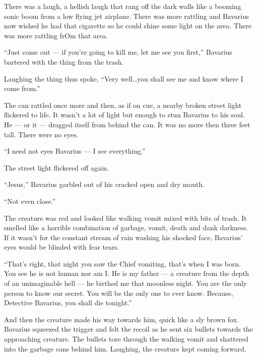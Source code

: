 There was a laugh, a hellish laugh that rang off the dark walls
like a booming sonic boom from a low flying jet airplane. There was
more rattling and Bavarius now wished he had that cigarette so he
could shine some light on the area. There was more rattling frOm
that area.



``Just come out --- if you're going to kill me, let me see
you first,'' Bavarius bartered with the thing from the
trash.



Laughing the thing thus spoke, ``Very well{\ldots}you shall see me
and know where I come from.''



The can rattled once more and then, as if on cue, a nearby broken
street light flickered to life. It wasn't a lot of light but enough
to stun Bavarius to his soul. He --- or it --- dragged
itself from behind the can. It was no more then three feet tall.
There were no eyes.



``I need not eyes Bavarius --- I see
everything.''



The street light flickered off again.



``Jesus,'' Bavarius garbled out of his cracked open and
dry mouth.



``Not even close.''



The creature was red and looked like walking vomit mixed with bits
of trash. It smelled like a horrible combination of garbage, vomit,
death and dank darkness. If it wasn't for the constant stream of
rain washing his shocked face, Bavarius' eyes would be blinded with
fear tears.



``That's right, that night you saw the Chief vomiting, that's
when I was born. You see he is not human nor am I. He is my father
--- a creature from the depth of an unimaginable hell ---
he birthed me that moonless night. You are the only person to know
our secret. You will be the only one to ever know. Because,
Detective Bavarius, you shall die tonight.''



And then the creature made his way towards him, quick like a sly
brown fox. Bavarius squeezed the trigger and felt the recoil as he
sent six bullets towards the approaching creature. The bullets tore
through the walking vomit and shattered into the garbage cans
behind him. Laughing, the creature kept coming forward.



